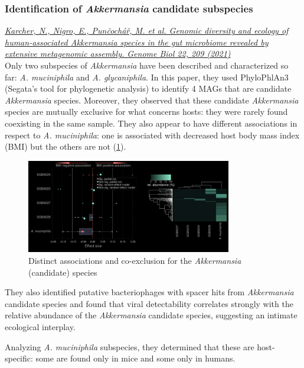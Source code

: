 \subsubsection{Identification of \emph{Akkermansia} candidate subspecies}

\href{https://genomebiology.biomedcentral.com/articles/10.1186/s13059-021-02427-7}{\emph{Karcher, N., Nigro, E., Punčochář, M. et al. Genomic diversity and ecology of human-associated \emph{Akkermansia} species in the gut microbiome revealed by extensive metagenomic assembly. Genome Biol 22, 209 (2021)}}\\

Only two subspecies of \emph{Akkermansia} have been described and characterized so far: \emph{A. muciniphila} and \emph{A. glycaniphila}. In this paper, they used PhyloPhlAn3 (Segata’s tool for phylogenetic analysis) to identify 4 MAGs that are candidate \emph{Akkermansia} species. 
Moreover, they observed that these candidate \emph{Akkermansia} species are mutually exclusive for what concerns hosts: they were rarely found coexisting in the same sample. They also appear to have different associations in respect to \emph{A. muciniphila}: one is associated with decreased host body mass index (BMI) but the others are not (\ref{fig:akk}).

\begin{figure}[!h]
\centering
\includegraphics[width=0.8\textwidth]{akkermansia.png}
\caption{\label{fig:akk}Distinct associations and co-exclusion for the \emph{Akkermansia} (candidate) species}
\end{figure}

They also identified putative bacteriophages with spacer hits from \emph{Akkermansia} candidate species and found that viral detectability correlates strongly with the relative abundance of the \emph{Akkermansia} candidate species, suggesting an intimate ecological interplay.

Analyzing \emph{A. muciniphila} subspecies, they determined that these are host-specific: some are found only in mice and some only in humans.

